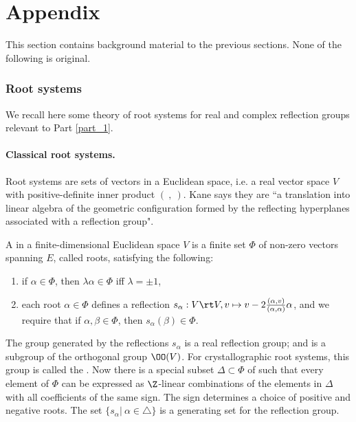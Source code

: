 \part{Appendix}
This section contains background material to the previous sections. None of the following is original.

\section{Root systems}\label{roots_for_complex_groups_sec}
We recall here some theory of root systems for real and complex reflection groups relevant to Part \ref{part_1}.\bb

\subsection{Classical root systems.} Root systems are sets of vectors in a Euclidean space, i.e. a real vector space $V$ with positive-definite inner product $(\ ,\ )$. Kane \cite{alma9917011264401631} says they are ``a translation into linear algebra of the geometric configuration formed by the reflecting hyperplanes associated with a reflection group".

\begin{definition}\label{root_system} A  in a finite-dimensional Euclidean space $V$ is a finite set $\Phi$ of non-zero vectors spanning $E$, called roots, satisfying the following:
\begin{enumerate}
    \item if $\alpha\in \Phi$, then $\lambda\alpha\in \Phi$ iff $\lambda=\pm 1$,
    
    \item each root $\alpha\in \Phi$ defines a reflection $s_\alpha:V\rt V, v\mapsto v-2\frac{(\alpha,v)}{(\alpha,\alpha)}\alpha$, and we require that if $\alpha,\beta\in \Phi$, then $s_\alpha(\beta)\in \Phi$.
\end{enumerate}
\end{definition}

\nt The group generated by the reflections $s_\alpha$ is a real reflection group; and is a subgroup of the orthogonal group $\OO(V)$. For crystallographic root systems, this group is called the . Now there is a special subset $\Delta\subset \Phi$ of  such that every element of $\Phi$ can be expressed as $\Z$-linear combinations of the elements in $\Delta$ with all coefficients of the same sign. The sign determines a choice of positive and negative roots. The set $\{s_\alpha|\ \alpha\in \triangle\}$ is a generating set for the reflection group.

